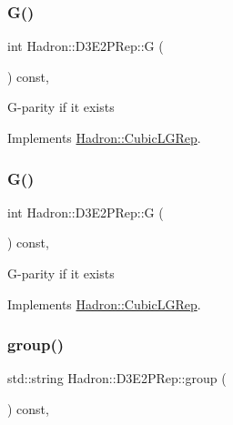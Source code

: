 \subsubsection{\texorpdfstring{G()}{G()}\hspace{0.1cm}{\footnotesize\ttfamily [2/3]}}
{\footnotesize\ttfamily int Hadron\+::\+D3\+E2\+P\+Rep\+::G (\begin{DoxyParamCaption}{ }\end{DoxyParamCaption}) const\hspace{0.3cm}{\ttfamily [inline]}, {\ttfamily [virtual]}}

G-\/parity if it exists 

Implements \mbox{\hyperlink{structHadron_1_1CubicLGRep_ace26f7b2d55e3a668a14cb9026da5231}{Hadron\+::\+Cubic\+L\+G\+Rep}}.

\mbox{\label{structHadron_1_1D3E2PRep_a2276ccf0f9c47ff521ba936da1f50e6d}} 
\subsubsection{\texorpdfstring{G()}{G()}\hspace{0.1cm}{\footnotesize\ttfamily [3/3]}}
{\footnotesize\ttfamily int Hadron\+::\+D3\+E2\+P\+Rep\+::G (\begin{DoxyParamCaption}{ }\end{DoxyParamCaption}) const\hspace{0.3cm}{\ttfamily [inline]}, {\ttfamily [virtual]}}

G-\/parity if it exists 

Implements \mbox{\hyperlink{structHadron_1_1CubicLGRep_ace26f7b2d55e3a668a14cb9026da5231}{Hadron\+::\+Cubic\+L\+G\+Rep}}.

\mbox{\label{structHadron_1_1D3E2PRep_aa62b1082d728526868a2269ac65e75aa}} 
\subsubsection{\texorpdfstring{group()}{group()}\hspace{0.1cm}{\footnotesize\ttfamily [1/3]}}
{\footnotesize\ttfamily std\+::string Hadron\+::\+D3\+E2\+P\+Rep\+::group (\begin{DoxyParamCaption}{ }\end{DoxyParamCaption}) const\hspace{0.3cm}{\ttfamily [inline]}, {\ttfamily [virtual]}}


